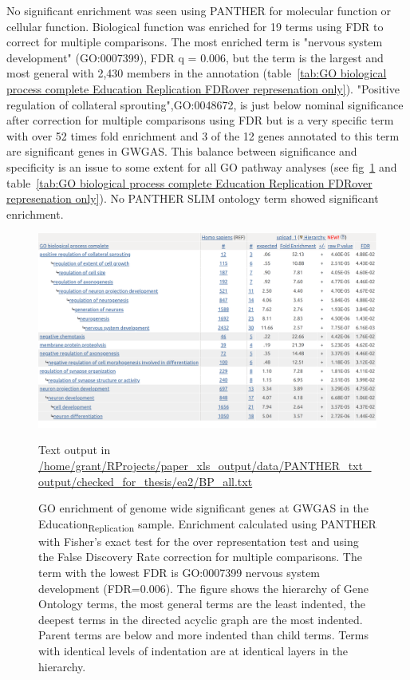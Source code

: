 No significant enrichment was seen using PANTHER for molecular function or cellular function. Biological function was enriched for 19 terms using FDR to correct for multiple comparisons. The most enriched term is "nervous system development" (GO:0007399), FDR q = 0.006, but the term is the largest and most general with 2,430 members in the annotation (table~\ref{tab:GO biological process complete Education Replication FDRover represenation only}). "Positive regulation of collateral sprouting",GO:0048672, is just below nominal significance after correction for multiple comparisons using FDR but is a very specific term with over 52 times fold enrichment and 3 of the 12 genes annotated to this term are significant genes in GWGAS. This balance between significance and specificity is an issue to some extent for all GO pathway analyses (see fig~\ref{tab:GO biological process complete Education Replication FDR} and table~\ref{tab:GO biological process complete Education Replication FDRover represenation only}). No PANTHER SLIM ontology term showed significant enrichment. 

 \begin{figure}
     \centering
     \includegraphics[width=\textwidth]{images/chapter2/large_screenshots/edu_replication_large_bp_panther.png}
     \caption[GO enrichment PANTHER Biological Process Education\textsubscript{Replication}]{GO enrichment of genome wide significant genes at GWGAS in the Education\textsubscript{Replication} sample. Enrichment calculated
     using PANTHER with Fisher's exact test for the over representation test and using the False Discovery Rate correction for multiple comparisons. The term with the lowest FDR is GO:0007399 nervous system development (FDR=0.006). The figure shows the hierarchy of Gene Ontology terms, the most general terms are the least indented, the deepest terms in the directed acyclic graph are the most indented. Parent terms are below and more indented than child terms. Terms with identical levels of indentation are at identical layers in the hierarchy.}
     \tiny{Text output in \url{/home/grant/RProjects/paper_xls_output/data/PANTHER_txt_output/checked_for_thesis/ea2/BP_all.txt}}%
     
     \label{tab:GO biological process complete Education Replication FDR}
 \end{figure}


